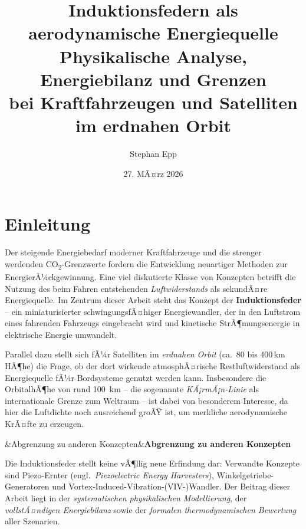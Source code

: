 ﻿\documentclass[12pt, a4paper]{report}
\title{%
  \textbf{Induktionsfedern als \\aerodynamische Energiequelle}\\[6pt]
  \large Physikalische Analyse, Energiebilanz und Grenzen\\
  bei Kraftfahrzeugen und Satelliten im erdnahen Orbit
}
\author{Stephan Epp}
\date{27. MÃ¤rz 2026}
\newenvironment{hinweis}[1][]{%
  \begin{hinweisframe}\sloppy%
  \ifx&#1&\else\textbf{#1}\par\smallskip\fi}{\end{hinweisframe}}
\theoremstyle{definition}
\theoremstyle{remark}
\begin{document}

\maketitle
\tableofcontents
\newpage

\chapter{Einleitung}
\label{chap:einleitung}

Der steigende Energiebedarf moderner Kraftfahrzeuge und die strenger werdenden
CO\textsubscript{2}-Grenzwerte fordern die Entwicklung neuartiger Methoden zur
EnergierÃ¼ckgewinnung. Eine viel diskutierte Klasse von Konzepten betrifft die
Nutzung des beim Fahren entstehenden \emph{Luftwiderstands} als sekundÃ¤re
Energiequelle. Im Zentrum dieser Arbeit steht das Konzept der
\textbf{Induktionsfeder} -- ein miniaturisierter schwingungsfÃ¤higer
Energiewandler, der in den Luftstrom eines fahrenden Fahrzeugs eingebracht
wird und kinetische StrÃ¶mungsenergie in elektrische Energie umwandelt.

Parallel dazu stellt sich fÃ¼r Satelliten im \emph{erdnahen Orbit} (ca.\ 80
bis 400\,km HÃ¶he) die Frage, ob der dort wirkende atmosphÃ¤rische Restluft\-widerstand
als Energiequelle fÃ¼r Bord\-systeme genutzt werden kann. Insbesondere die
OrbitalhÃ¶he von rund \SI{100}{\kilo\metre} -- die sogenannte \emph{KÃ¡rmÃ¡n-Linie}
als internationale Grenze zum Weltraum -- ist dabei von besonderem Interesse,
da hier die Luftdichte noch ausreichend groÃŸ ist, um merkliche aerodynamische
KrÃ¤fte zu erzeugen.

\begin{hinweis}[Abgrenzung zu anderen Konzepten]
  Die Induktionsfeder stellt keine vÃ¶llig neue Erfindung dar: Verwandte
  Konzepte sind Piezo-Ernter (engl.\ \emph{Piezoelectric Energy Harvesters}),
  Winkelgetriebe-Generatoren und Vortex-Induced-Vibration-(VIV-)Wandler.
  Der Beitrag dieser Arbeit liegt in der \emph{systematischen physikalischen
  Modellierung}, der \emph{vollstÃ¤ndigen Energiebilanz} sowie der
  \emph{formalen thermodynamischen Bewertung} aller Szenarien.
\end{hinweis}
\end{document}
